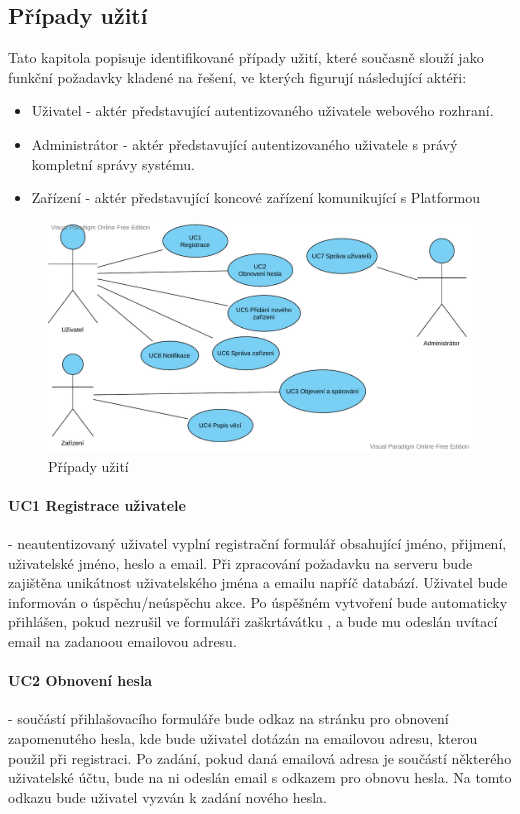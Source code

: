\subsection{Případy užití}
Tato kapitola popisuje identifikované případy užití, které současně slouží jako funkční požadavky kladené na řešení, ve kterých figurují následující aktéři:
\begin{itemize}
    \item Uživatel - aktér představující autentizovaného uživatele webového rozhraní.
    \item Administrátor - aktér představující autentizovaného uživatele s právý kompletní správy systému.
    \item Zařízení - aktér představující koncové zařízení komunikující s Platformou
\end{itemize}

\begin{figure}[htbp]
    \centering
    \includegraphics[width=\textwidth]{img/use_case.pdf}
    \caption{Případy užití}
\end{figure}

\paragraph{UC1 Registrace uživatele}
- neautentizovaný uživatel vyplní registrační formulář obsahující jméno, přijmení, uživatelské jméno, heslo a email. Při zpracování požadavku na serveru bude zajištěna unikátnost uživatelského jména a emailu napříč databází. Uživatel bude informován o úspěchu/neúspěchu akce. Po úspěšném vytvoření bude automaticky přihlášen, pokud nezrušil ve formuláři zaškrtávátku , a bude mu odeslán uvítací email na zadanoou emailovou adresu.

\paragraph{UC2 Obnovení hesla}
- součástí přihlašovacího formuláře bude odkaz na stránku pro obnovení zapomenutého hesla, kde bude uživatel dotázán na emailovou adresu, kterou použil při registraci. Po zadání, pokud daná emailová adresa je součástí některého uživatelské účtu, bude na ni odeslán email s odkazem pro obnovu hesla. Na tomto odkazu bude uživatel vyzván k zadání nového hesla.

